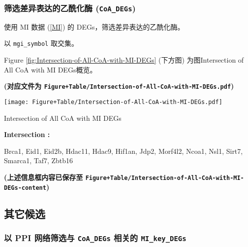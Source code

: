 \documentclass[
]{article}
\begin{document}
\hypertarget{ux7b5bux9009ux5deeux5f02ux8868ux8fbeux7684ux4e59ux9170ux5316ux9176-coa_degs}{%
\subsubsection{\texorpdfstring{筛选差异表达的乙酰化酶 (\texttt{CoA\_DEGs})}{筛选差异表达的乙酰化酶 (CoA\_DEGs)}}\label{ux7b5bux9009ux5deeux5f02ux8868ux8fbeux7684ux4e59ux9170ux5316ux9176-coa_degs}}

使用 MI 数据 (\ref{MI}) 的 DEGs，筛选差异表达的乙酰化酶。

以 \texttt{mgi\_symbol} 取交集。

Figure \ref{fig:Intersection-of-All-CoA-with-MI-DEGs} (下方图) 为图Intersection of All CoA with MI DEGs概览。

\textbf{(对应文件为 \texttt{Figure+Table/Intersection-of-All-CoA-with-MI-DEGs.pdf})}

\def\@captype{figure}
\begin{center}
\texttt{[image: Figure+Table/Intersection-of-All-CoA-with-MI-DEGs.pdf]}
\caption{Intersection of All CoA with MI DEGs}\label{fig:Intersection-of-All-CoA-with-MI-DEGs}
\end{center}
\begin{center}\begin{tcolorbox}[colback=gray!10, colframe=gray!50, width=0.9\linewidth, arc=1mm, boxrule=0.5pt]
\textbf{
Intersection
:}

\vspace{0.5em}

    Brca1, Eid1, Eid2b, Hdac11, Hdac9, Hif1an, Jdp2,
Morf4l2, Ncoa1, Nsl1, Sirt7, Smarca1, Taf7, Zbtb16

\vspace{2em}
\end{tcolorbox}
\end{center}

\textbf{(上述信息框内容已保存至 \texttt{Figure+Table/Intersection-of-All-CoA-with-MI-DEGs-content})}

\hypertarget{ux5176ux5b83ux5019ux9009}{%
\subsection{其它候选}\label{ux5176ux5b83ux5019ux9009}}

\hypertarget{ppi}{%
\subsubsection{\texorpdfstring{以 PPI 网络筛选与 \texttt{CoA\_DEGs} 相关的 \texttt{MI\_key\_DEGs}}{以 PPI 网络筛选与 CoA\_DEGs 相关的 MI\_key\_DEGs}}\label{ppi}}
\end{document}

